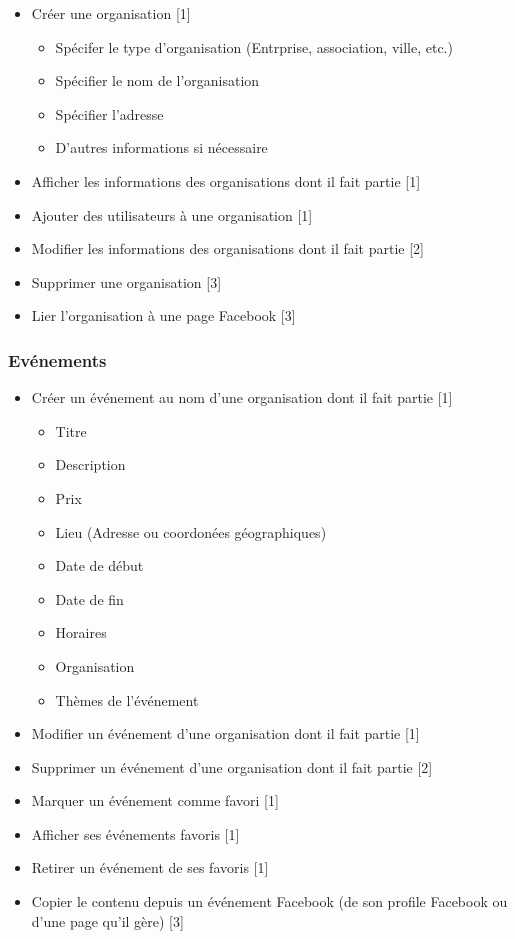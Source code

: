 \documentclass[11pt, a4paper, french, twoside]{article}
\begin{document}
				\begin{itemize}
					\item Créer une organisation [1]
						\begin{itemize}
							\item Spécifer le type d'organisation (Entrprise, association, ville, etc.)
							\item Spécifier le nom de l'organisation
							\item Spécifier l'adresse
							\item D'autres informations si nécessaire
						\end{itemize}
					\item Afficher les informations des organisations dont il fait partie [1]
					\item Ajouter des utilisateurs à une organisation [1]
					\item Modifier les informations des organisations dont il fait partie [2]
					\item Supprimer une organisation [3]
					\item Lier l'organisation à une page Facebook [3]
				\end{itemize}
			
			\subsubsection{Evénements}
			\label{subsubsec:evenements}
				\begin{itemize}
					\item Créer un événement au nom d'une organisation dont il fait partie [1]
						\begin{itemize}
							\item Titre
							\item Description
							\item Prix
							\item Lieu (Adresse ou coordonées géographiques)
							\item Date de début
							\item Date de fin
							\item Horaires
							\item Organisation
							\item Thèmes de l'événement
						\end{itemize}
					\item Modifier un événement d'une organisation dont il fait partie [1]
					\item Supprimer un événement d'une organisation dont il fait partie [2]
					\item Marquer un événement comme favori [1]
					\item Afficher ses événements favoris [1]
					\item Retirer un événement de ses favoris [1]
					\item Copier le contenu depuis un événement Facebook (de son profile Facebook ou d'une page qu'il gère) [3]
				\end{itemize}
			
\end{document}
